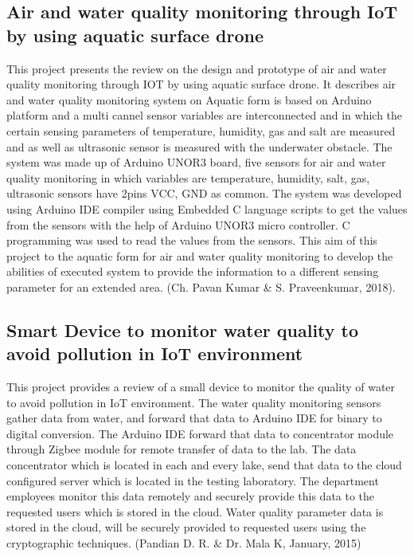 \documentclass[12pt]{article}
\begin{document}
				\subsection*{Air and water quality monitoring through IoT by using aquatic surface drone}
					This project presents the review on the design and prototype of air and water quality monitoring through IOT by using aquatic surface drone. It describes air and water quality monitoring system on Aquatic form is based on Arduino platform and a multi cannel sensor variables are interconnected and in which the certain sensing parameters of temperature, humidity, gas and salt are measured and as well as ultrasonic sensor is measured with the underwater obstacle. The system was made up of Arduino UNOR3 board, five sensors for air and water quality monitoring in which variables are temperature, humidity, salt, gas, ultrasonic sensors have 2pins VCC, GND as common. The system was developed using Arduino IDE compiler using Embedded C language scripts to get the values from the sensors with the help of Arduino UNOR3 micro controller.  C programming was used to read the values from the sensors. This aim of this project to the aquatic form for air and water quality monitoring to develop the abilities of executed system to provide the information to a different sensing parameter for an extended area. (Ch. Pavan Kumar \& S. Praveenkumar, 2018).					
							
			\subsection*{Smart Device to monitor water quality to avoid pollution in IoT environment}
				This project provides a review of a small device to monitor the quality of water to avoid pollution in IoT environment. The water quality monitoring sensors gather data from water, and forward that data to Arduino IDE for binary to digital conversion. The Arduino IDE forward that data to concentrator module through Zigbee module for remote transfer of data to the lab. The data concentrator which is located in each and every lake, send that data to the cloud configured server which is located in the testing laboratory. The department employees monitor this data remotely and securely provide this data to the requested users which is stored in the cloud. Water quality parameter data is stored in the cloud, will be securely provided to requested users using the cryptographic techniques. (Pandian D. R. \& Dr. Mala K, January, 2015)
				
\end{document}

